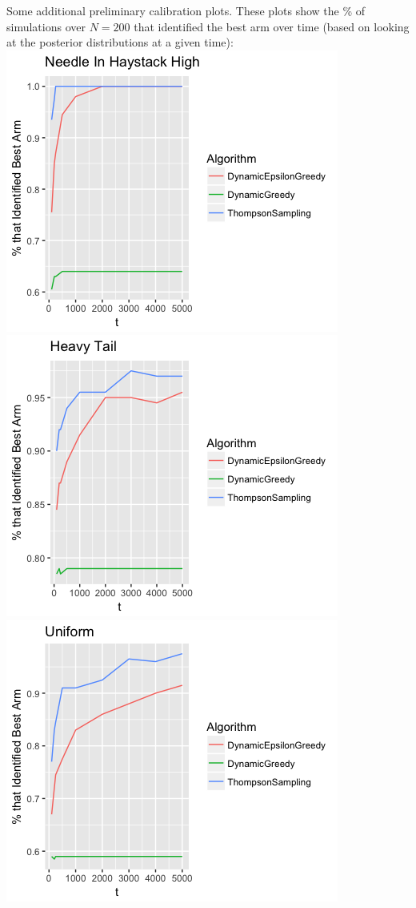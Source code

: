 \documentclass[11pt,letterpaper]{article}
\begin{document}
Some additional preliminary calibration plots. These plots show the \% of simulations over $N=200$ that identified the best arm over time (based on looking at the posterior distributions at a given time): \\
\includegraphics[scale=0.5]{"needle_in_haystack_best_arm_ident"} \\
\includegraphics[scale=0.5]{"heavy_tail_best_arm_ident"} \\
\includegraphics[scale=0.5]{"uniform_best_arm_identification"} 
\end{document}
